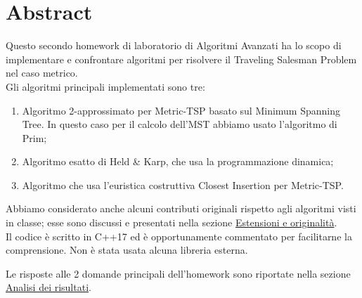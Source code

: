 \section{Abstract}
\label{cap:abstract}

Questo secondo homework di laboratorio di Algoritmi Avanzati ha lo scopo di implementare e confrontare algoritmi per risolvere il Traveling Salesman Problem nel caso metrico. \\

\noindent Gli algoritmi principali implementati sono tre:

\begin{enumerate}
    \item Algoritmo 2-approssimato per Metric-TSP basato sul Minimum Spanning Tree. In questo caso per il calcolo dell'MST abbiamo usato l'algoritmo di Prim;
    \item Algoritmo esatto di Held \& Karp, che usa la programmazione dinamica;
    \item Algoritmo che usa l'euristica costruttiva Closest Insertion per Metric-TSP.
\end{enumerate}

\noindent Abbiamo considerato anche alcuni contributi originali rispetto agli algoritmi visti in classe; esse sono discussi e presentati nella sezione \hyperref[cap:extensions-and-originalities]{Estensioni e originalità}. \\

\noindent Il codice è scritto in C++17 ed è opportunamente commentato per facilitarne la comprensione. Non è stata usata alcuna libreria esterna.

\noindent Le risposte alle 2 domande principali dell'homework sono riportate nella sezione \hyperref[cap:performance-analysis]{Analisi dei risultati}.
